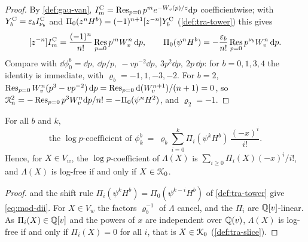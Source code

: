 \begin{proof}
By \cref{def:gau-van}, $I^{\mathrm{C}}_m=\operatorname*{Res}_{p=0}p^me^{-W_{v}(p)/z}\mathrm{d} p$ coefficientwise; with $Y^{\mathrm{C}}_b=\varepsilon_bI^{\mathrm{C}}_{\nu_b}$ and $\Pi_0(z^nH^b)=(-1)^{n+1}[z^{-n}]Y^{\mathrm{C}}_b$ (\cref{def:tra-tower}) this gives
\[
[z^{-n}]I^{\mathrm{C}}_m=\frac{(-1)^n}{n!}\operatorname*{Res}_{p=0}p^mW_{v}^n\,\mathrm{d} p,\qquad \Pi_0(\psi^nH^b)=-\frac{\varepsilon_b}{n!}\operatorname*{Res}_{p=0}p^{\nu_b}W_{v}^n\,\mathrm{d} p .
\]
Compare with $\dd\phi^b_0=\dd p,\ \dd p/p,\ -vp^{-2}\dd p,\ 3p^2\dd p,\ 2p\,\dd p$: for $b=0,1,3,4$ the identity is immediate, with $\varrho_b=-1,1,-3,-2$. For $b=2$, $\operatorname*{Res}_{p=0}W_{v}^n(p^3-vp^{-2})\,\mathrm{d} p=\operatorname*{Res}_{p=0}\mathrm{d}(W_{v}^{n+1})/(n+1)=0$, so $\mathcal R^2_n=-\operatorname*{Res}_{p=0}p^3W_{v}^n\mathrm{d} p/n!=-\Pi_0(\psi^nH^2)$, and $\varrho_2=-1$.
\end{proof}

\begin{prop}
\label{prop:mod-dii}
For all $b$ and $k$,
\begin{equation}
\label{eq:mod-dii}
\text{the }\log p\text{-coefficient of }\phi^b_k\ =\ \varrho_b\sum_{i=0}^k\Pi_i(\psi^kH^b)\,\frac{(-x)^i}{i!}.
\end{equation}
Hence, for $X\in V_w$, the $\log p$-coefficient of $\Lambda(X)$ is $\sum_{i\geq 0}\Pi_i(X)(-x)^i/i!$, and $\Lambda(X)$ is log-free if and only if $X\in\mathcal{K}_{0}$.
\end{prop}

\begin{proof}
 and the shift rule $\Pi_i(\psi^kH^b)=\Pi_0(\psi^{k-i}H^b)$ of \cref{def:tra-tower} give \eqref{eq:mod-dii}. For $X\in V_w$ the factors $\varrho_b^{-1}$ of $\Lambda$ cancel, and the $\Pi_i$ are $\mathbb{Q}[v]$-linear. As $\Pi_i(X)\in\mathbb{Q}[v]$ and the powers of $x$ are independent over $\mathbb{Q}(v)$, $\Lambda(X)$ is log-free if and only if $\Pi_i(X)=0$ for all $i$, that is $X\in\mathcal{K}_{0}$ (\cref{def:tra-slice}).
\end{proof}


